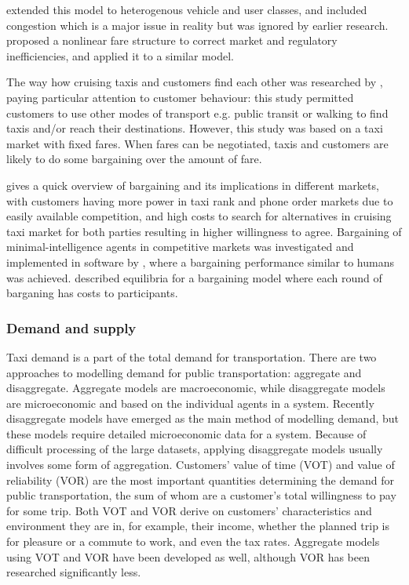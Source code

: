 \textcite{Wong2008taxi+modeling} extended this model to heterogenous vehicle
and user classes, and included congestion which is a major issue in reality but
was ignored by earlier research. \textcite{Yang2010taxi+nonlinear} proposed a
nonlinear fare structure to correct market and regulatory inefficiencies, and
applied it to a similar model.

The way how cruising taxis and customers find each other was researched by
\textcite{Yang2010taxi+equilibria}, paying particular attention to customer
behaviour: this study permitted customers to use other modes of transport e.g.
public transit or walking to find taxis and/or reach their destinations.
However, this study was based on a taxi market with fixed fares. When fares can
be negotiated, taxis and customers are likely to do some bargaining over the
amount of fare.

\textcite{Cairns1996taxi+competition} gives a quick overview of bargaining and
its implications in different markets, with customers having more power in taxi
rank and phone order markets due to easily available competition, and high
costs to search for alternatives in cruising taxi market for both parties
resulting in higher willingness to agree. Bargaining of minimal-intelligence
agents in competitive markets was investigated and implemented in software by
\textcite{Cli1997taxi+bargaining}, where a bargaining performance similar to
humans was achieved. \textcite{Rubinstein1982taxi+bargaining} described
equilibria for a bargaining model where each round of barganing has costs to
participants.

\subsubsection{Demand and supply}
\label{sec:literature:taxis:demand}

Taxi demand is a part of the total demand for transportation. There are two
approaches to modelling demand for public transportation: aggregate and
disaggregate. Aggregate models are macroeconomic, while disaggregate models are
microeconomic and based on the individual agents in a system. Recently
disaggregate models have emerged as the main method of modelling demand, but
these models require detailed microeconomic data for a system. Because of
difficult processing of the large datasets, applying disaggregate models
usually involves some form of aggregation. Customers' value of time (VOT) and
value of reliability (VOR) are the most important quantities determining the
demand for public transportation, the sum of whom are a customer's total
willingness to pay for some trip. Both VOT and VOR derive on customers'
characteristics and environment they are in, for example, their income, whether
the planned trip is for pleasure or a commute to work, and even the tax rates.
Aggregate models using VOT and VOR have been developed as well, although VOR
has been researched significantly less. \parencite{Small2007taxi+urban}

